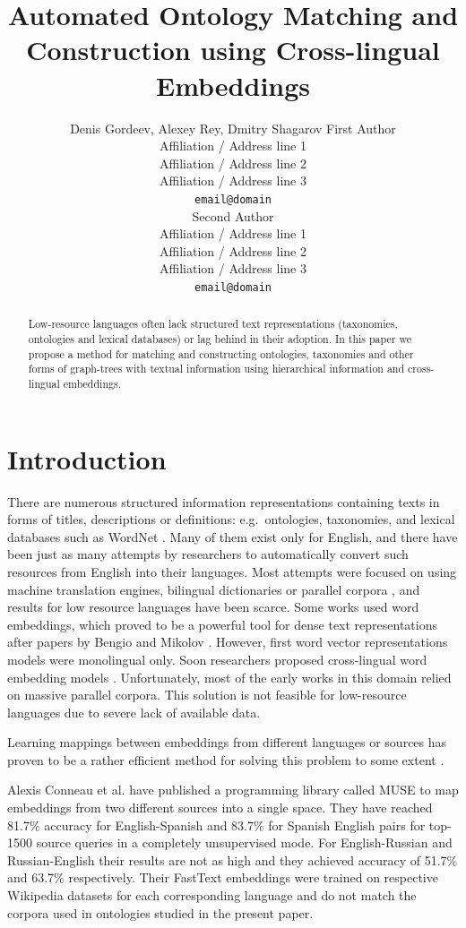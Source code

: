 \documentclass[11pt,a4paper]{article}
\title{Automated Ontology Matching and Construction using Cross-lingual Embeddings}
\author{Denis Gordeev, Alexey Rey, Dmitry Shagarov
	First Author \\
  Affiliation / Address line 1 \\
  Affiliation / Address line 2 \\
  Affiliation / Address line 3 \\
  \texttt{email@domain} \\\And
  Second Author \\
  Affiliation / Address line 1 \\
  Affiliation / Address line 2 \\
  Affiliation / Address line 3 \\
  \texttt{email@domain} \\}
\date{}
\begin{document}
\maketitle
\begin{abstract}
Low-resource languages often lack structured text representations (taxonomies, ontologies and lexical databases) or lag behind in their adoption. In this paper we propose a method for matching and constructing ontologies, taxonomies and other forms of graph-trees with textual information using hierarchical information and cross-lingual embeddings.
\end{abstract}

\section{Introduction}

There are numerous structured information representations containing texts in forms of titles, descriptions or definitions: e.g.\ ontologies, taxonomies, and lexical databases such as WordNet \cite{wordnet}. Many of them exist only for English, and there have been just as many attempts by researchers to automatically convert such resources from English into their languages. Most attempts were focused on using machine translation engines, bilingual dictionaries or parallel corpora \cite{Khodak2017,NEALE18.1030}, and results for low resource languages have been scarce. Some works used word embeddings, which proved to be a powerful tool for dense text representations after papers by Bengio \cite{bengio} and Mikolov \cite{mikolov-representations-2013}. However, first word vector representations models were monolingual only. Soon researchers proposed cross-lingual word embedding models \cite{mikolov-parallel,lazaridou-parallel}. Unfortunately, most of the early works in this domain relied on massive parallel corpora. This solution is not feasible for low-resource languages due to severe lack of available data.

Learning mappings between embeddings from different languages or sources has proven to be a rather efficient method for solving this problem to some extent \cite{ruder-survey}.

Alexis Conneau et al. \cite{muse} have published a programming library called MUSE to map embeddings from two different sources into a single space. They have reached 81.7\% accuracy for English-Spanish and 83.7\% for Spanish English pairs for top-1500 source queries in a completely unsupervised mode. For English-Russian and Russian-English their results are not as high and they achieved accuracy of 51.7\% and 63.7\% respectively. Their FastText embeddings were trained on respective Wikipedia datasets for each corresponding language and do not match the corpora used in ontologies studied in the present paper.
\end{document}
